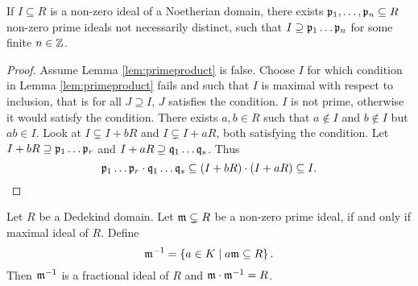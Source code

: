 \begin{lemma}
\label{lem:primeproduct}
If $ I \subseteq R $ is a non-zero ideal of a Noetherian domain, there exists $ \mathfrak{p}_1, \dots, \mathfrak{p}_n \subseteq R $ non-zero prime ideals not necessarily distinct, such that $ I \supseteq \mathfrak{p}_1 \dots \mathfrak{p}_n $ for some finite $ n \in \mathbb{Z} $.
\end{lemma}

\pagebreak

\begin{proof}
Assume Lemma \ref{lem:primeproduct} is false. Choose $ I $ for which condition in Lemma \ref{lem:primeproduct} fails and such that $ I $ is maximal with respect to inclusion, that is for all $ J \supseteq I $, $ J $ satisfies the condition. $ I $ is not prime, otherwise it would satisfy the condition. There exists $ a, b \in R $ such that $ a \notin I $ and $ b \notin I $ but $ ab \in I $. Look at $ I \subsetneq I + bR $ and $ I \subsetneq I + aR $, both satisfying the condition. Let $ I + bR \supseteq \mathfrak{p}_1 \dots \mathfrak{p}_r $ and $ I + aR \supseteq \mathfrak{q}_1 \dots \mathfrak{q}_s $.
Thus
$$ \mathfrak{p}_1 \dots \mathfrak{p}_r \cdot \mathfrak{q}_1 \dots \mathfrak{q}_s \subseteq \left( I + bR \right) \cdot \left( I + aR \right) \subseteq I. $$
\end{proof}

\begin{proposition}
\label{prop:inverse}
Let $ R $ be a Dedekind domain. Let $ \mathfrak{m} \subsetneq R $ be a non-zero prime ideal, if and only if maximal ideal of $ R $. Define
$$ \mathfrak{m}^{-1} = \left\{ a \in K \mid a\mathfrak{m} \subseteq R \right\}. $$
Then $ \mathfrak{m}^{-1} $ is a fractional ideal of $ R $ and $ \mathfrak{m} \cdot \mathfrak{m}^{-1} = R $.
\end{proposition}



